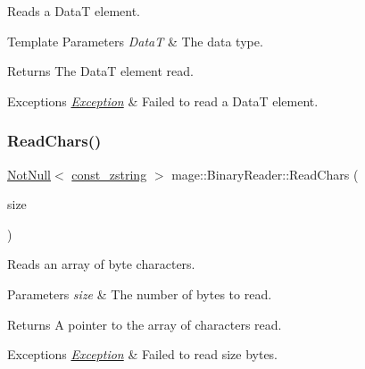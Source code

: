 Reads a {\ttfamily DataT} element.


\begin{DoxyTemplParams}{Template Parameters}
{\em DataT} & The data type. \\
\hline
\end{DoxyTemplParams}
\begin{DoxyReturn}{Returns}
The {\ttfamily DataT} element read. 
\end{DoxyReturn}

\begin{DoxyExceptions}{Exceptions}
{\em \mbox{\hyperlink{classmage_1_1_exception}{Exception}}} & Failed to read a {\ttfamily DataT} element. \\
\hline
\end{DoxyExceptions}
\mbox{\label{classmage_1_1_binary_reader_ad2bed0756a38358fc4a8b10b02007af8}} 
\subsubsection{\texorpdfstring{Read\+Chars()}{ReadChars()}}
{\footnotesize\ttfamily \mbox{\hyperlink{namespacemage_a8769f9d670d6b585ea306cb1062af94b}{Not\+Null}}$<$ \mbox{\hyperlink{namespacemage_abfd9206dc607ceb5d13ec68bf075a5c0}{const\+\_\+zstring}} $>$ mage\+::\+Binary\+Reader\+::\+Read\+Chars (\begin{DoxyParamCaption}\item[{size\+\_\+t}]{size }\end{DoxyParamCaption})\hspace{0.3cm}{\ttfamily [protected]}}

Reads an array of byte characters.


\begin{DoxyParams}{Parameters}
{\em size} & The number of bytes to read. \\
\hline
\end{DoxyParams}
\begin{DoxyReturn}{Returns}
A pointer to the array of characters read. 
\end{DoxyReturn}

\begin{DoxyExceptions}{Exceptions}
{\em \mbox{\hyperlink{classmage_1_1_exception}{Exception}}} & Failed to read {\ttfamily size} bytes. \\
\hline
\end{DoxyExceptions}
\mbox{\label{classmage_1_1_binary_reader_a67157828a9781644fb55bd7f3558f07c}} 
